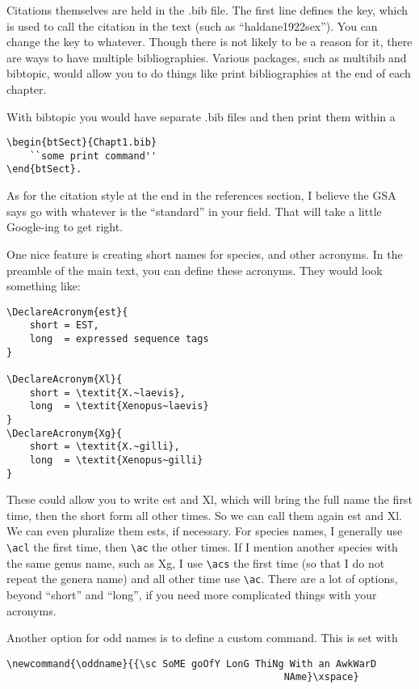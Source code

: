 Citations themselves are held in the .bib file. The first line defines the key, which is used to call the citation in the text (such as ``haldane1922sex''). You can change the key to whatever. Though there is not likely to be a reason for it, there are ways to have multiple bibliographies. Various packages, such as multibib and bibtopic, would allow you to do things like print bibliographies at the end of each chapter. 

With bibtopic you would have separate .bib files and then print them within a 
\begin{verbatim}
\begin{btSect}{Chapt1.bib}
	``some print command''
\end{btSect}.
\end{verbatim}

As for the citation style at the end in the references section, I believe the GSA says go with whatever is the ``standard'' in your field. That will take a little Google-ing to get right. 

\clearpage %

One nice feature is creating short names for species, and other acronyms. In the preamble of the main text, you can define these acronyms. They would look something like:
\begin{verbatim}
\DeclareAcronym{est}{
	short = EST,
	long  = expressed sequence tags
}

\DeclareAcronym{Xl}{
	short = \textit{X.~laevis},
	long  = \textit{Xenopus~laevis}
}
\DeclareAcronym{Xg}{
	short = \textit{X.~gilli},
	long  = \textit{Xenopus~gilli}
}
\end{verbatim}

These could allow you to write \ac{est} and \acl{Xl}, which will bring the full name the first time, then the short form all other times. So we can call them again \ac{est} and \ac{Xl}. We can even pluralize them \acp{est}, if necessary. For species names, I generally use \verb+\acl+ the first time, then \verb+\ac+ the other times. If I mention another species with the same genus name, such as \acs{Xg}, I use \verb+\acs+ the first time (so that I do not repeat the genera name) and all other time use \verb+\ac+. There are a lot of options, beyond ``short'' and ``long'', if you need more complicated things with your acronyms. 

Another option for odd names is to define a custom command. This is set with
\begin{verbatim}
\newcommand{\oddname}{{\sc SoME goOfY LonG ThiNg With an AwkWarD 
                                                NAme}\xspace}
\end{verbatim}

